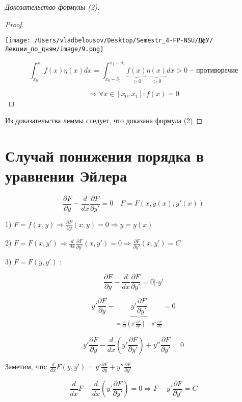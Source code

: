 \documentclass[12pt, a4paper]{report}
\begin{document}
\begin{proof}[Докозательство формулы (2)]
\begin{proof}
        \begin{center}
            \texttt{[image: /Users/vladbelousov/Desktop/Semestr\_4-FP-NSU/ДфУ/Лекции\_по\_дням/image/9.png]}
        \end{center}

        \[ \int_{ x_0 }^{x_1} f(x ) \eta(x ) dx = \int_{x_0 - \delta_0}^{x_1- \delta_0} \underbrace{f(x)}_{>0} \underbrace{\eta( x)}_{>0} dx >0 - \text{противоречие}    \] 

        \[ \Rightarrow \forall x \in  [x_0, x_1] : f(x) = 0  \] 
    \end{proof}

    Из доказательства леммы следует, что доказана формула (2)
\end{proof}

\section{Случай понижения порядка в уравнении Эйлера}   

\[ \frac{\partial F}{\partial y} - \frac{d}{d x }  \frac{\partial F}{\partial y'} = 0 \quad  F=F(x,y(x),y'(x))  \] 

1) \(\displaystyle  F= f(x,y) \Rightarrow \frac{\partial F }{\partial y} (x,y) =0 \Rightarrow y= y(x)    \) 

2) \( \displaystyle F= F (x, y ') \Rightarrow \frac{d}{dx }  \frac{\partial F }{\partial y'} (x,y') =0 \Rightarrow \frac{\partial F }{\partial y'} (x,y') = C    \) 


3) \( F= F( y , y ') \) :

\[ \frac{\partial F }{\partial y } - \frac{d}{dx }  \frac{\partial F }{\partial y '} = 0 | \cdot y '     \] 

\[ y' \frac{\partial F }{\partial y } - \underbrace{y ' \frac{ \partial F }{\partial y '}}_{= \frac{d}{dx } \left( y ' \frac{\partial F }{\partial y '} \right)- y'' \frac{\partial F }{\partial y '} }    = 0 \] 

\[ y' \frac{\partial F }{\partial y } - \frac{d}{dx } \left( y ' \frac{\partial F }{\partial y '}  \right)+ y'' \frac{\partial F }{\partial y '}  = 0 \] 

Заметим, что: \( \displaystyle \frac{d}{dx }F(y,y')  = y' \frac{\partial F }{\partial y } + y '' \frac{\partial F }{\partial y '}   \) 

\[ \frac{d}{dx }  F - \frac{d}{dx } \left( y ' \frac{\partial F }{\partial y '}           \right) = 0 \Rightarrow \boxed{F- y ' \frac{\partial F }{\partial y '} = C}   \] 
\end{document}
